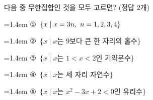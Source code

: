 다음 중 무한집합인 것을 모두 고르면? (정답 $2$개)
\par\medskip\par\noindent\hangindent=1.4em {\small ①}\ $\{x \mid x=3n,\ n=1{,}\mkern3mu\mathopen{}2{,}\mkern3mu\mathopen{}3{,}\mkern3mu\mathopen{}4\}$\par\noindent\hangindent=1.4em {\small ②}\ $\{x \mid x$는 $9$보다 큰 한 자리의 홀수$\}$\par\noindent\hangindent=1.4em {\small ③}\ $\{x \mid x$는 $1<x<2$인 기약분수$\}$\par\noindent\hangindent=1.4em {\small ④}\ $\{x \mid x$는 세 자리 자연수$\}$\par\noindent\hangindent=1.4em {\small ⑤}\ $\{x \mid x$는 $x^2-3x+2<0$인 유리수$\}$\par\medskip
